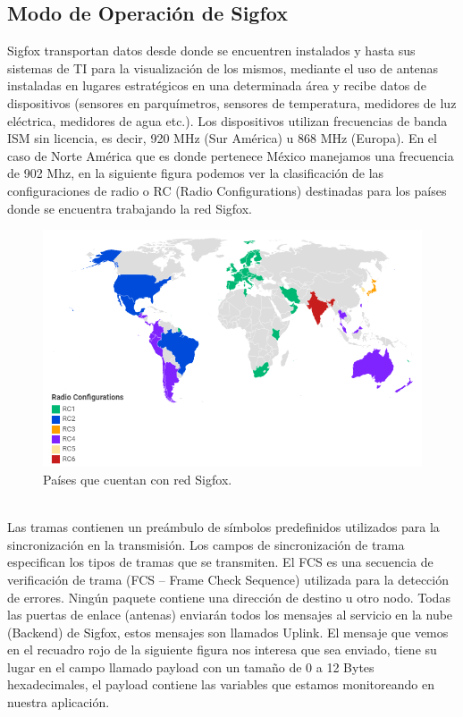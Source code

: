 \documentclass[12pt]{book}
\begin{document}
\subsection{Modo de Operación de Sigfox}
Sigfox transportan datos desde donde se encuentren instalados y hasta sus sistemas de TI para la visualización de los mismos, mediante el uso de antenas instaladas en lugares estratégicos en una determinada área y recibe datos de dispositivos (sensores en parquímetros, sensores de temperatura, medidores de luz eléctrica, medidores de agua etc.). 
Los dispositivos utilizan frecuencias de banda ISM sin licencia, es decir, 920 MHz (Sur América) u 868 MHz (Europa). En el caso de Norte América que es donde pertenece México manejamos una frecuencia de 902 Mhz, en la siguiente figura podemos ver la clasificación de las configuraciones de radio o RC (Radio Configurations) destinadas para los países donde se encuentra trabajando la red Sigfox.
\begin{figure}[h]
	\centering
	\includegraphics[width=0.8\linewidth]{imagenes/redsigfox}
	\caption[Países que cuentan con red Sigfox.]{Países que cuentan con red Sigfox.}
	\label{fig:redsigfox}
\end{figure} \\
Las tramas contienen un preámbulo de símbolos predefinidos utilizados para la sincronización en la transmisión. Los campos de sincronización de trama especifican los tipos de tramas que se transmiten. El FCS es una secuencia de verificación de trama (FCS – Frame Check Sequence) utilizada para la detección de errores. Ningún paquete contiene una dirección de destino u otro nodo. Todas las puertas de enlace (antenas) enviarán todos los mensajes al servicio en la nube (Backend) de Sigfox, estos mensajes son llamados Uplink. El mensaje que vemos en el recuadro rojo de la siguiente figura nos interesa que sea enviado, tiene su lugar en el campo llamado payload con un tamaño de 0 a 12 Bytes hexadecimales, el payload contiene las variables que estamos monitoreando en nuestra aplicación.
\end{document}
